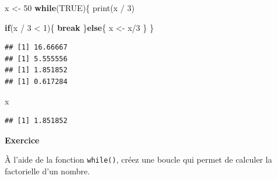 \documentclass[
  11pt,
]{book}
\newenvironment{Shaded}{\begin{snugshade}}{\end{snugshade}}
\newcommand{\ConstantTok}[1]{\textcolor[rgb]{0.00,0.00,0.00}{#1}}
\newcommand{\ControlFlowTok}[1]{\textcolor[rgb]{0.13,0.29,0.53}{\textbf{#1}}}
\newcommand{\DecValTok}[1]{\textcolor[rgb]{0.00,0.00,0.81}{#1}}
\newcommand{\FunctionTok}[1]{\textcolor[rgb]{0.00,0.00,0.00}{#1}}
\newcommand{\NormalTok}[1]{#1}
\newcommand{\OtherTok}[1]{\textcolor[rgb]{0.56,0.35,0.01}{#1}}
\newcommand{\SpecialCharTok}[1]{\textcolor[rgb]{0.00,0.00,0.00}{#1}}
\numberwithin{equation}{section}
\numberwithin{countremarque}{section}
\newenvironment{notebox}{
  \begin{tcolorbox}[breakable, colback=jaune,coltext=black,
                  colframe=grisfonce]}
 {\end{tcolorbox}}
\newenvironment{greenbox}{
  \begin{tcolorbox}[breakable, colback=vert,coltext=black,
                  colframe=grisfonce]}
 {\end{tcolorbox}}
\begin{document}
\begin{notebox}
\begin{Shaded}
\begin{Highlighting}[]
\NormalTok{x }\OtherTok{\textless{}{-}} \DecValTok{50}
\ControlFlowTok{while}\NormalTok{(}\ConstantTok{TRUE}\NormalTok{)\{}
  \FunctionTok{print}\NormalTok{(x }\SpecialCharTok{/} \DecValTok{3}\NormalTok{)}
  
  \ControlFlowTok{if}\NormalTok{(x }\SpecialCharTok{/} \DecValTok{3} \SpecialCharTok{\textless{}} \DecValTok{1}\NormalTok{)\{}
    \ControlFlowTok{break}
\NormalTok{  \}}\ControlFlowTok{else}\NormalTok{\{}
\NormalTok{    x }\OtherTok{\textless{}{-}}\NormalTok{ x}\SpecialCharTok{/}\DecValTok{3}
\NormalTok{  \}}
\NormalTok{\}}
\end{Highlighting}
\end{Shaded}

\begin{lstlisting}
## [1] 16.66667
## [1] 5.555556
## [1] 1.851852
## [1] 0.617284
\end{lstlisting}

\begin{Shaded}
\begin{Highlighting}[]
\NormalTok{x}
\end{Highlighting}
\end{Shaded}

\begin{lstlisting}
## [1] 1.851852
\end{lstlisting}

\end{notebox}

\begin{greenbox}
\textbf{Exercice}

À l'aide de la fonction \texttt{while()}, créez une boucle qui permet de calculer la factorielle d'un nombre.

\end{greenbox}
\end{document}

